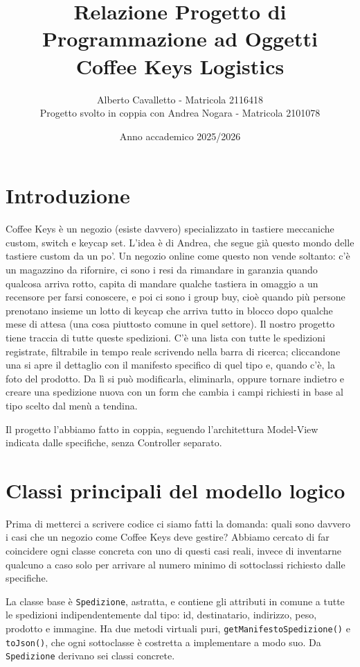 \documentclass[10pt,a4paper]{article}
\title{Relazione Progetto di Programmazione ad Oggetti\\\large Coffee Keys Logistics}
\author{Alberto Cavalletto - Matricola 2116418\\Progetto svolto in coppia con Andrea Nogara - Matricola 2101078}
\date{Anno accademico 2025/2026}
\begin{document}
\maketitle
\tableofcontents
\newpage

\section{Introduzione}

Coffee Keys è un negozio (esiste davvero) specializzato in tastiere meccaniche custom, switch e keycap set. L'idea è di Andrea, che segue già questo mondo delle tastiere custom da un po'. Un negozio online come questo non vende soltanto: c'è un magazzino da rifornire, ci sono i resi da rimandare in garanzia quando qualcosa arriva rotto, capita di mandare qualche tastiera in omaggio a un recensore per farsi conoscere, e poi ci sono i group buy, cioè quando più persone prenotano insieme un lotto di keycap che arriva tutto in blocco dopo qualche mese di attesa (una cosa piuttosto comune in quel settore). Il nostro progetto tiene traccia di tutte queste spedizioni. C'è una lista con tutte le spedizioni registrate, filtrabile in tempo reale scrivendo nella barra di ricerca; cliccandone una si apre il dettaglio con il manifesto specifico di quel tipo e, quando c'è, la foto del prodotto. Da lì si può modificarla, eliminarla, oppure tornare indietro e creare una spedizione nuova con un form che cambia i campi richiesti in base al tipo scelto dal menù a tendina.

Il progetto l'abbiamo fatto in coppia, seguendo l'architettura Model-View indicata dalle specifiche, senza Controller separato.

\section{Classi principali del modello logico}

Prima di metterci a scrivere codice ci siamo fatti la domanda: quali sono davvero i casi che un negozio come Coffee Keys deve gestire? Abbiamo cercato di far coincidere ogni classe concreta con uno di questi casi reali, invece di inventarne qualcuno a caso solo per arrivare al numero minimo di sottoclassi richiesto dalle specifiche.

La classe base è \texttt{Spedizione}, astratta, e contiene gli attributi in comune a tutte le spedizioni indipendentemente dal tipo: id, destinatario, indirizzo, peso, prodotto e immagine. Ha due metodi virtuali puri, \texttt{getManifestoSpedizione()} e \texttt{toJson()}, che ogni sottoclasse è costretta a implementare a modo suo. Da \texttt{Spedizione} derivano sei classi concrete.
\end{document}
